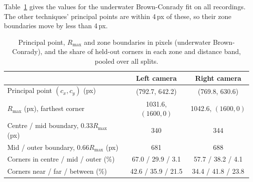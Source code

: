 Table~\ref{tab:app:zones} gives the values for the underwater Brown-Conrady fit on all recordings. The other
techniques' principal points are within 4\,px of these, so their zone boundaries move by less than 4\,px.

\begin{table}[H]
\centering
\caption{Principal point, $R_{\max}$ and zone boundaries in pixels (underwater Brown-Conrady), and the share of
held-out corners in each zone and distance band, pooled over all splits.}
\label{tab:app:zones}
\small
\begin{tabular}{lcc}
\toprule
 & Left camera & Right camera \\
\midrule
Principal point $(c_x, c_y)$ (px)        & (792.7, 642.2) & (769.8, 630.6) \\
$R_{\max}$ (px), farthest corner          & 1031.6, $(1600, 0)$ & 1042.6, $(1600, 0)$ \\
Centre / mid boundary, $0.33R_{\max}$ (px) & 340 & 344 \\
Mid / outer boundary, $0.66R_{\max}$ (px)  & 681 & 688 \\
\midrule
Corners in centre / mid / outer (\%)     & 67.0 / 29.9 / 3.1 & 57.7 / 38.2 / 4.1 \\
Corners near / far / between (\%)        & 42.6 / 35.9 / 21.5 & 34.4 / 41.8 / 23.8 \\
\bottomrule
\end{tabular}
\end{table}

